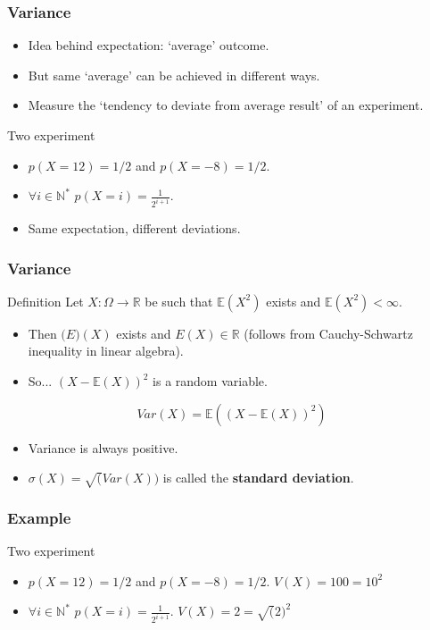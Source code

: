 \documentclass{beamer}
\begin{document}
\begin{frame}
  \frametitle{Variance}
  \begin{itemize}
  \item Idea behind expectation: `average' outcome.
  \item But same `average' can be achieved in different ways.
  \item Measure the `tendency to deviate from average result' of an experiment.
  \end{itemize}

  \begin{exampleblock}{Two experiment}
    \begin{itemize}
    \item $p(X = 12) = 1/2$ and $p(X=-8) = 1/2$.
    \item $\forall i \in \mathbb{N}^{*}$ $p(X = i)=\frac{1}{2^{i+1}}$.
    \item Same expectation, different deviations.
    \end{itemize}
  \end{exampleblock}
\end{frame}

\begin{frame}
  \frametitle{Variance}
  \begin{block}{Definition}
    Let $X: \Omega \rightarrow \mathbb{R}$ be such that $\mathbb{E}(X^2)$ exists and $\mathbb{E}(X^2) < \infty$.
    \begin{itemize}
    \item Then $\mathbb(E)(X)$ exists and $E(X) \in \mathbb{R}$ (follows from Cauchy-Schwartz inequality in linear algebra).
    \item So... $(X - \mathbb{E}(X))^2$ is a random variable.
    \end{itemize}
    \[Var(X) = \mathbb{E}((X - \mathbb{E}(X))^2)\]
  \end{block}
  \begin{itemize}
  \item Variance is always positive.
  \item $\sigma(X) = \sqrt(Var(X))$ is called the \textbf{standard deviation}.
  \end{itemize}
\end{frame}

\begin{frame}
  \frametitle{Example}
  \begin{exampleblock}{Two experiment}
      \begin{itemize}
        \item $p(X = 12) = 1/2$ and $p(X=-8) = 1/2$. \alert{$V(X) = 100 = 10^2$}
        \item $\forall i \in \mathbb{N}^{*}$ $p(X = i)=\frac{1}{2^{i+1}}$. \alert{$V(X) = 2 = \sqrt(2)^2$}
      \end{itemize}
    \end{exampleblock}
\end{frame}
\end{document}
